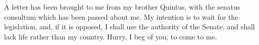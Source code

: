 

 A letter has been brought to me from my brother Quintus, with the senatus consultum which has been passed about me. My intention is to wait for the legislation, and, if it is opposed, I shall use the authority of the Senate, and shall lack life rather than my country. Hurry, I beg of you, to come to me.
